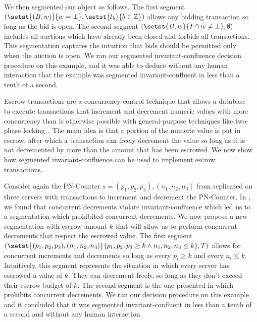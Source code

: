 We then segmented our object as follows. The first segment $(\setst{(B, w)}{w =
\bot}, \setst{t_b}{b \in \ints})$ allows any bidding transaction so long as the
bid is open. The second segment $(\setst{B, w}{I \cap w \neq \bot}, \emptyset)$
includes all auctions which have already been closed and forbids all
transactions. This segmentation captures the intuition that bids should be
permitted only when the auction is open. We ran our segmented
invariant-confluence decision procedure on this example, and it was able to
deduce without any human interaction that the example was segmented
invariant-confluent in less than a tenth of a second.

Escrow transactions are a concurrency control technique that allows a database
to execute transactions that increment and decrement numeric values with more
concurrency than is otherwise possible with general-purpose techniques like
two-phase locking~\cite{o1986escrow}. The main idea is that a portion of the
numeric value is put in escrow, after which a transaction can freely decrement
the value so long as it is not decremented by more than the amount that has
been escrowed. We now show how segmented invariant-confluence can be used to
implement escrow transactions.

Consider again the PN-Counter $s = (p_1, p_2, p_3), (n_1, n_2, n_3)$ from
 replicated on three servers with transactions
to increment and decrement the PN-Counter. In
, we found that concurrent decrements violate
invariant-confluence which led us to a segmentation which prohibited concurrent
decrements. We now propose a new segmentation with escrow amount $k$ that will
allow us to perform concurrent decrements that respect the escrowed value. The
first segment $(\setst{(p_1, p_2, p_3), (n_1, n_2, n_3)}{p_1, p_2, p_3 \geq k
\land n_1, n_2, n_3 \leq k}, T)$ allows for concurrent increments and
decrements so long as every $p_i \geq k$ and every $n_i \leq k$. Intuitively,
this segment represents the situation in which every server has escrowed a
value of $k$. They can decrement freely, so long as they don't exceed their
escrow budget of $k$. The second segment is the one presented in
 which prohibits concurrent decrements. We ran
our decision procedure on this example and it concluded that it was segmented
invariant-confluent in less than a tenth of a second and without any human
interaction.

